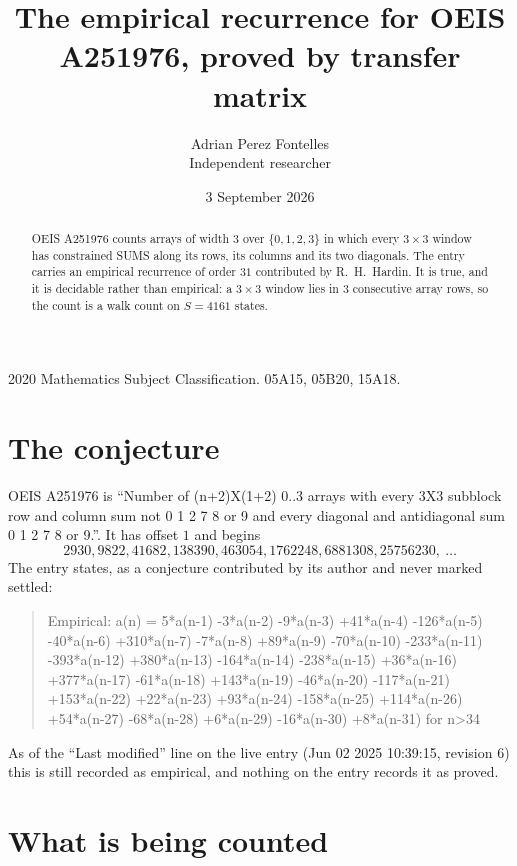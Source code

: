 \documentclass[11pt,a4paper]{article}
\title{The empirical recurrence for OEIS A251976, proved by transfer matrix}
\author{Adrian Perez Fontelles\\ \small Independent researcher}
\date{3 September 2026}
\theoremstyle{plain}
\theoremstyle{definition}
\begin{document}
\maketitle

\begin{abstract}
OEIS A251976 counts arrays of width $3$ over $\{0,1,2,3\}$ in which every $3\times3$ window has
constrained SUMS along its rows, its columns and its two diagonals. The entry carries an
empirical recurrence of order $31$ contributed by R.~H.~Hardin. It is true, and it is
decidable rather than empirical: a $3\times3$ window lies in $3$ consecutive array rows,
so the count is a walk count on $S=4161$ states.
\end{abstract}

\noindent\small 2020 Mathematics Subject Classification. 05A15, 05B20, 15A18.\normalsize

\section{The conjecture}

OEIS A251976 is ``Number of (n+2)X(1+2) 0..3 arrays with every 3X3 subblock row and column sum not 0 1 2 7 8 or 9 and every diagonal and antidiagonal sum 0 1 2 7 8 or 9.''. It has offset $1$ and begins
\[
2930, 9822, 41682, 138390, 463054, 1762248, 6881308, 25756230,\ \dots
\]
The entry states, as a conjecture contributed by its author and never marked settled:
\begin{quote}
Empirical: a(n) = 5*a(n-1) -3*a(n-2) -9*a(n-3) +41*a(n-4) -126*a(n-5) -40*a(n-6) +310*a(n-7) -7*a(n-8) +89*a(n-9) -70*a(n-10) -233*a(n-11) -393*a(n-12) +380*a(n-13) -164*a(n-14) -238*a(n-15) +36*a(n-16) +377*a(n-17) -61*a(n-18) +143*a(n-19) -46*a(n-20) -117*a(n-21) +153*a(n-22) +22*a(n-23) +93*a(n-24) -158*a(n-25) +114*a(n-26) +54*a(n-27) -68*a(n-28) +6*a(n-29) -16*a(n-30) +8*a(n-31) for n>34
\end{quote}
As of the ``Last modified'' line on the live entry (Jun 02 2025 10:39:15, revision 6) this is still
recorded as empirical, and nothing on the entry records it as proved.

\section{What is being counted}
\end{document}
